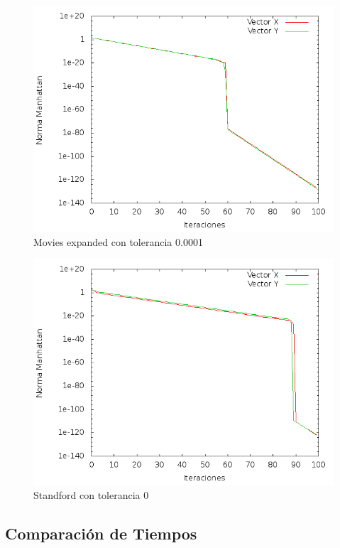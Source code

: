 \begin{figure}[!htb]
\begin{center}
    \includegraphics[scale=0.5]{imagenes/hits-movie.png}
    \caption{Movies expanded con tolerancia 0.0001}
  \end{center}
\end{figure}
\begin{figure}[!htb]
\begin{center}
    \includegraphics[scale=0.5]{imagenes/hits-stadfor.png}
    \caption{Standford con tolerancia 0}
    \end{center}
\end{figure}

\subsection{Comparación de Tiempos}
 

